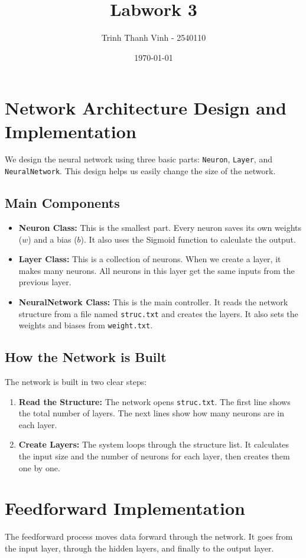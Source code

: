 \documentclass[12pt]{article}
\title{Labwork 3}
\author{Trinh Thanh Vinh - 2540110}
\date{\today}
\begin{document}
\maketitle

\section{Network Architecture Design and Implementation}
We design the neural network using three basic parts: \texttt{Neuron}, \texttt{Layer}, and \texttt{NeuralNetwork}. This design helps us easily change the size of the network.

\subsection{Main Components}
\begin{itemize}
    \item \textbf{Neuron Class:} This is the smallest part. Every neuron saves its own weights ($w$) and a bias ($b$). It also uses the Sigmoid function to calculate the output.
    \item \textbf{Layer Class:} This is a collection of neurons. When we create a layer, it makes many neurons. All neurons in this layer get the same inputs from the previous layer.
    \item \textbf{NeuralNetwork Class:} This is the main controller. It reads the network structure from a file named \texttt{struc.txt} and creates the layers. It also sets the weights and biases from \texttt{weight.txt}.
\end{itemize}

\subsection{How the Network is Built}
The network is built in two clear steps:
\begin{enumerate}
    \item \textbf{Read the Structure:} The network opens \texttt{struc.txt}. The first line shows the total number of layers. The next lines show how many neurons are in each layer.
    \item \textbf{Create Layers:} The system loops through the structure list. It calculates the input size and the number of neurons for each layer, then creates them one by one.
\end{enumerate}

\section{Feedforward Implementation}
The feedforward process moves data forward through the network. It goes from the input layer, through the hidden layers, and finally to the output layer.
\end{document}
